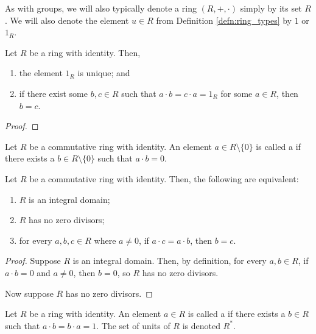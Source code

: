 As with groups, we will also typically denote a ring $ (R,+,\cdot) $ simply by its set $ R $. We will also denote the element $ u\in R $ from Definition \ref{defn:ring_types} by $ 1 $ or $ 1_R $.

\begin{prop}
Let $ R $ be a ring with identity. Then,
\begin{enumerate}
    \item the element $ 1_R $ is unique; and
    \item if there exist some $ b,c\in R $ such that $ a\cdot b=c\cdot a=1_R $ for some $ a\in R $, then $ b=c $.
\end{enumerate}
\end{prop}
\begin{proof}
\end{proof}

\begin{defn}
Let $ R $ be a commutative ring with identity. An element $ a\in R\setminus\{0\} $ is called a  if there exists a $ b\in R\setminus\{0\} $ such that $ a\cdot b=0 $.
\end{defn}

\begin{prop}
Let $ R $ be a commutative ring with identity. Then, the following are equivalent:
\begin{enumerate}
    \item $ R $ is an integral domain;
    \item $ R $ has no zero divisors;
    \item for every $ a,b,c\in R $ where $ a\neq 0 $, if $ a\cdot c=a\cdot b $, then $ b=c $.
\end{enumerate}
\end{prop}
\begin{proof}
Suppose $ R $ is an integral domain. Then, by definition, for every $ a,b\in R $, if $ a\cdot b=0 $ and $ a\neq 0 $, then $ b=0 $, so $ R $ has no zero divisors.

Now suppose $ R $ has no zero divisors.
\end{proof}

\begin{defn}
Let $ R $ be a ring with identity. An element $ a\in R $ is called a  if there exists a $ b\in R $ such that $ a\cdot b=b\cdot a=1 $. The set of units of $ R $ is denoted $ R^* $.
\end{defn}

